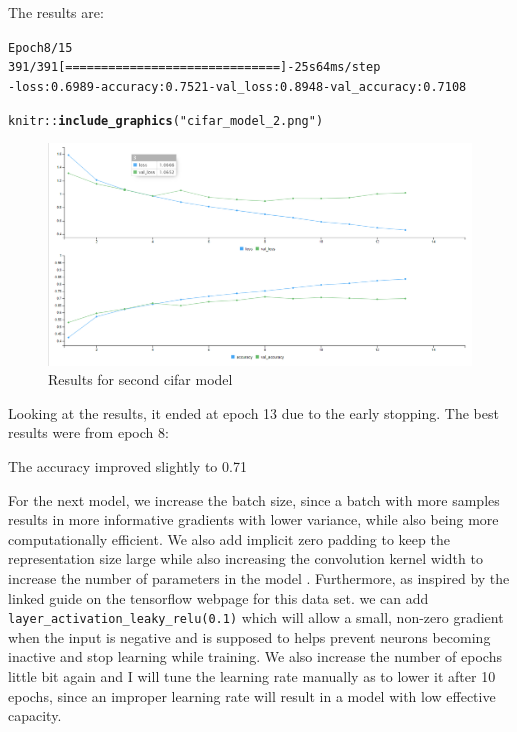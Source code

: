 \documentclass[10pt, a4paper, english]{article}\usepackage[]{graphicx}\usepackage[dvipsnames]{xcolor}
\makeatletter
\def\maxwidth{ %
  \ifdim\Gin@nat@width>\linewidth
    \linewidth
  \else
    \Gin@nat@width
  \fi
}
\newcommand{\hlstr}[1]{\textcolor[rgb]{0.192,0.494,0.8}{#1}}%
\newcommand{\hlopt}[1]{\textcolor[rgb]{0,0,0}{#1}}%
\newcommand{\hlstd}[1]{\textcolor[rgb]{0.345,0.345,0.345}{#1}}%
\newcommand{\hlkwd}[1]{\textcolor[rgb]{0.737,0.353,0.396}{\textbf{#1}}}%
\newenvironment{kframe}{%
 \def\at@end@of@kframe{}%
 \ifinner\ifhmode%
  \def\at@end@of@kframe{\end{minipage}}%
  \begin{minipage}{\columnwidth}%
 \fi\fi%
 \def\FrameCommand##1{\hskip\@totalleftmargin \hskip-\fboxsep
 \colorbox{shadecolor}{##1}\hskip-\fboxsep
     \hskip-\linewidth \hskip-\@totalleftmargin \hskip\columnwidth}%
 \MakeFramed {\advance\hsize-\width
   \@totalleftmargin\z@ \linewidth\hsize
   \@setminipage}}%
 {\par\unskip\endMakeFramed%
 \at@end@of@kframe}
\newenvironment{knitrout}{}{} %
\makeatother
\begin{document}
The results are:
\begin{knitrout}
\color{fgcolor}\begin{kframe}
\begin{alltt}
Epoch 8/15
391/391 [==============================] - 25s 64ms/step
- loss: 0.6989 - accuracy: 0.7521 - val_loss: 0.8948 - val_accuracy: 0.7108
\end{alltt}
\end{kframe}
\end{knitrout}


\begin{knitrout}
\color{fgcolor}\begin{kframe}
\begin{alltt}
\hlstd{knitr}\hlopt{::}\hlkwd{include_graphics}\hlstd{(}\hlstr{"cifar_model_2.png"}\hlstd{)}
\end{alltt}
\end{kframe}\begin{figure}
\includegraphics[width=\maxwidth]{cifar_model_2} \caption[Results for second cifar model]{Results for second cifar model}\label{fig:unnamed-chunk-25}
\end{figure}

\end{knitrout}

Looking at the results, it ended at epoch 13 due to the early stopping. The best results were from epoch 8:


The accuracy improved slightly to 0.71

For the next model, we increase the batch size, since a batch with more samples results in more informative gradients with lower variance, while also being more computationally efficient. We also add implicit zero padding to keep the representation size large while also increasing the convolution kernel width to increase the number of parameters in the model . Furthermore, as inspired by the linked guide on the tensorflow webpage for this data set. we can add \texttt{layer\_activation\_leaky\_relu(0.1)} which will allow a small, non-zero gradient when the input is negative and is supposed to helps prevent neurons becoming inactive and stop learning while training. We also increase the number of epochs little bit again and I will tune the learning rate manually as to lower it after 10 epochs, since an improper learning rate will result in a model with low effective capacity.
\end{document}
